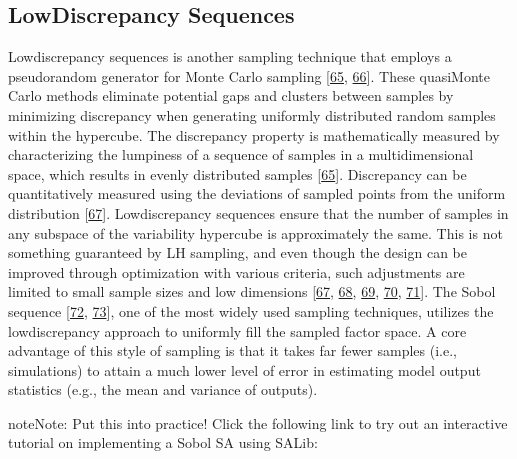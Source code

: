 \documentclass[letterpaper,10pt,english]{book}
\begin{document}
\subsection{Low\sphinxhyphen{}Discrepancy Sequences}
\label{\detokenize{3_sensitivity_analysis_the_basics:low-discrepancy-sequences}}
\sphinxAtStartPar
Low\sphinxhyphen{}discrepancy sequences is another sampling technique that employs a pseudo\sphinxhyphen{}random generator for Monte Carlo sampling {[}\hyperlink{cite.index:id81}{65}, \hyperlink{cite.index:id92}{66}{]}. These quasi\sphinxhyphen{}Monte Carlo methods eliminate potential gaps and clusters between samples by minimizing discrepancy when generating uniformly distributed random samples within the hypercube. The discrepancy property is mathematically measured by characterizing the lumpiness of a sequence of samples in a multidimensional space, which results in evenly distributed samples {[}\hyperlink{cite.index:id81}{65}{]}. Discrepancy can be quantitatively measured using the deviations of sampled points from the uniform distribution {[}\hyperlink{cite.index:id95}{67}{]}. Low\sphinxhyphen{}discrepancy sequences ensure that the number of samples in any subspace of the variability hypercube is approximately the same. This is not something guaranteed by LH sampling, and even though the design can be improved through optimization with various criteria, such adjustments are limited to small sample sizes and low dimensions {[}\hyperlink{cite.index:id95}{67}, \hyperlink{cite.index:id93}{68}, \hyperlink{cite.index:id94}{69}, \hyperlink{cite.index:id96}{70}, \hyperlink{cite.index:id97}{71}{]}. The Sobol sequence {[}\hyperlink{cite.index:id98}{72}, \hyperlink{cite.index:id99}{73}{]}, one of the most widely used sampling techniques, utilizes the low\sphinxhyphen{}discrepancy approach to uniformly fill the sampled factor space. A core advantage of this style of sampling is that it takes far fewer samples (i.e., simulations) to attain a much lower level of error in estimating model output statistics (e.g., the mean and variance of outputs).

\begin{sphinxadmonition}{note}{Note:}
\sphinxAtStartPar
Put this into practice! Click the following link to try out an interactive tutorial on implementing a Sobol SA using SALib:  
\end{sphinxadmonition}
\end{document}
